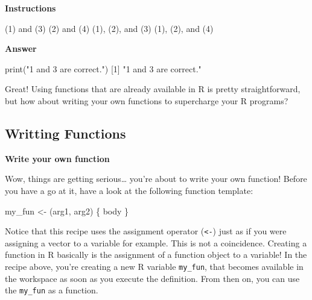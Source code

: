 \documentclass[]{article}
\newcommand{\hlnum}[1]{\textcolor[rgb]{0.816,0.125,0.439}{#1}}%
\newcommand{\hlstr}[1]{\textcolor[rgb]{0.251,0.627,0.251}{#1}}%
\newcommand{\hlstd}[1]{\textcolor[rgb]{0.251,0.251,0.251}{#1}}%
\newcommand{\hlkwd}[1]{\textcolor[rgb]{0.878,0.439,0.125}{#1}}%
\newenvironment{Shaded}{\begin{myshaded}}{\end{myshaded}}
\newcommand{\KeywordTok}[1]{\hlkwd{#1}}
\newcommand{\DecValTok}[1]{\hlnum{#1}}
\newcommand{\StringTok}[1]{\hlstr{#1}}
\newcommand{\NormalTok}[1]{\hlstd{#1}}
\begin{document}
\textbf{Instructions}

\begin{Shaded}
\begin{Highlighting}[]

\OperatorTok{*}\StringTok{ }\NormalTok{(}\DecValTok{1}\NormalTok{) }\KeywordTok{and}\NormalTok{ (}\DecValTok{3}\NormalTok{)}
\OperatorTok{*}\StringTok{ }\NormalTok{(}\DecValTok{2}\NormalTok{) }\KeywordTok{and}\NormalTok{ (}\DecValTok{4}\NormalTok{)}
\OperatorTok{*}\StringTok{ }\NormalTok{(}\DecValTok{1}\NormalTok{), (}\DecValTok{2}\NormalTok{), }\KeywordTok{and}\NormalTok{ (}\DecValTok{3}\NormalTok{)}
\OperatorTok{*}\StringTok{ }\NormalTok{(}\DecValTok{1}\NormalTok{), (}\DecValTok{2}\NormalTok{), }\KeywordTok{and}\NormalTok{ (}\DecValTok{4}\NormalTok{)}
\end{Highlighting}
\end{Shaded}

\textbf{Answer}

\begin{Shaded}
\begin{Highlighting}[]
\KeywordTok{print}\NormalTok{(}\StringTok{"1 and 3 are correct."}\NormalTok{)}
\NormalTok{   [}\DecValTok{1}\NormalTok{] }\StringTok{"1 and 3 are correct."}
\end{Highlighting}
\end{Shaded}

Great! Using functions that are already available in R is pretty
straightforward, but how about writing your own functions to supercharge
your R programs?

\subsection{Writting Functions}\label{writting-functions}

\textbf{Write your own function}

Wow, things are getting serious\ldots{} you're about to write your own
function! Before you have a go at it, have a look at the following
function template:

\begin{Shaded}
\begin{Highlighting}[]
\NormalTok{my_fun <-}\StringTok{ }\NormalTok{(arg1, arg2) \{}
\NormalTok{body}
\NormalTok{\}}
\end{Highlighting}
\end{Shaded}

Notice that this recipe uses the assignment operator
(\texttt{\textless{}-}) just as if you were assigning a vector to a
variable for example. This is not a coincidence. Creating a function in
R basically is the assignment of a function object to a variable! In the
recipe above, you're creating a new R variable \texttt{my\_fun}, that
becomes available in the workspace as soon as you execute the
definition. From then on, you can use the \texttt{my\_fun} as a
function.
\end{document}
